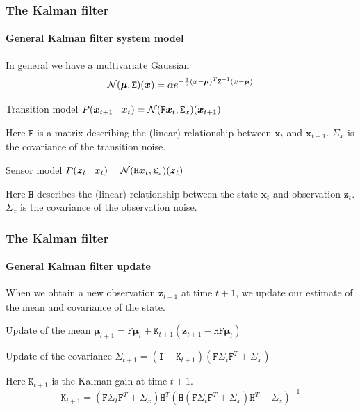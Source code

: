 \documentclass[aspectratio=169]{beamer}
\renewcommand{\vec}[1]{\boldsymbol{#1}}
\newcommand{\mat}[1]{\mathtt{#1}}
\def\norm{\mbox{$\cal{N}$}}
\begin{document}
\begin{frame}
\frametitle{The Kalman filter}
\framesubtitle{General Kalman filter system model}

In general we have a multivariate Gaussian
\[ \norm(\vec{\mu},\mat{\Sigma})(\vec{x}) = \alpha
    e^{ -\frac{1}{2} (\vec{x}-\vec{\mu})^T \mat{\Sigma}^{-1}
    (\vec{x}-\vec{\mu}) } \]

\begin{block}{Transition model}
$P(\vec{x}_{t+1} \mid \vec{x}_t) =
\norm(\mat{F}\vec{x}_t,\mat{\Sigma}_x)(\vec{x}_{t+1})$
\end{block}
Here $\mat{F}$ is a matrix describing the (linear) relationship between
$\vec{x}_{t}$ and $\vec{x}_{t+1}$.  $\mat{\Sigma}_x$ is the covariance of
the transition noise.

\begin{block}{Sensor model}
$P(\vec{z}_t \mid \vec{x}_t) =
\norm(\mat{H}\vec{x}_t,\mat{\Sigma}_z)(\vec{z}_t)$
\end{block}

Here $\mat{H}$ describes the (linear) relationship between the state
$\vec{x}_{t}$ and observation $\vec{z}_t$.  $\mat{\Sigma}_z$ is the
covariance of the observation noise.

\end{frame}

\begin{frame}
\frametitle{The Kalman filter}
\framesubtitle{General Kalman filter update}

When we obtain a new observation $\vec{z}_{t+1}$ at time $t+1$, we
update our estimate of the mean and covariance of the state.

\begin{block}{Update of the mean}
$\vec{\mu}_{t+1} = \mat{F} \vec{\mu}_t + \mat{K}_{t+1} ( \vec{z}_{t+1}
- \mat{H} \mat{F} \vec{\mu}_t )$
\end{block}

\begin{block}{Update of the covariance}
$\mat{\Sigma}_{t+1} = ( \mat{I} - \mat{K}_{t+1} ) ( \mat{F}
\mat{\Sigma}_t \mat{F}^T + \mat{\Sigma}_x )$
\end{block}

Here $\mat{K}_{t+1}$ is the \alert{Kalman gain} at time $t+1$.
\begin{equation*}
\mat{K}_{t+1} = (\mat{F}\mat{\Sigma}_t \mat{F}^T + \mat{\Sigma}_x)
\mat{H}^T (\mat{H}(\mat{F} \mat{\Sigma}_t \mat{F}^T +
\mat{\Sigma}_x)\mat{H}^T + \mat{\Sigma}_z)^{-1}
\end{equation*}


\end{frame}
\end{document}
